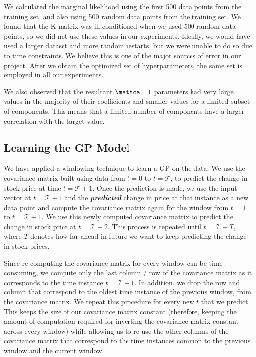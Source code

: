 \documentclass{article} %
\def\bfl{\mathbf \mathcal l}
\begin{document}
We calculated the marginal likelihood using the first 500 data points from the training set, and also using 500 random data points from the training set.
We found that the K matrix was ill-conditioned when we used 500 random data points, so we did not use these values in our experiments.
Ideally, we would have used a larger dataset and more random restarts, but we were unable to do so due to time constraints.
We believe this is one of the major sources of error in our project.
After we obtain the optimized set of hyperparameters, the same set is employed in all our experiments.

We also observed that the resultant $\bfl$ parameters had very large values in the majority of their coefficients and smaller values for a limited subset of components.
This means that a limited number of components have a larger correlation with the target value.


\subsection{Learning the GP Model}

We have applied a windowing technique to learn a GP on the data. We use the covariance matrix built using data from $t = 0$ to $t = \mathcal{T}$, to predict the change in stock price at time $t = \mathcal{T}+1$. Once the prediction is made, we use the input vector at $t = \mathcal{T}+1$ and the \textbf{\textit{predicted}} change in price at that instance as a new data point and compute the covariance matrix again for the window from $t = 1$ to $t = \mathcal{T}+1$. We use this newly computed covariance matrix to predict the change in stock price at $t=\mathcal{T}+2$. This process is repeated until $t = \mathcal{T}+T$, where $T$ denotes how far ahead in future we want to keep predicting the change in stock prices.

Since re-computing the covariance matrix for every window can be time consuming, we compute only the last column / row of the covariance matrix as it corresponds to the time instance $t = \mathcal{T}+1$. In addition, we drop the row and column that correspond to the oldest time instance of the previous window, from the covariance matrix. We repeat this procedure for every new $t$ that we predict. This keeps the size of our covariance matrix constant (therefore, keeping the amount of computation required for inverting the covariance matrix constant across every window) while allowing us to re-use the other columns of the covariance matrix that correspond to the time instances common to the previous window and the current window.
\end{document}
